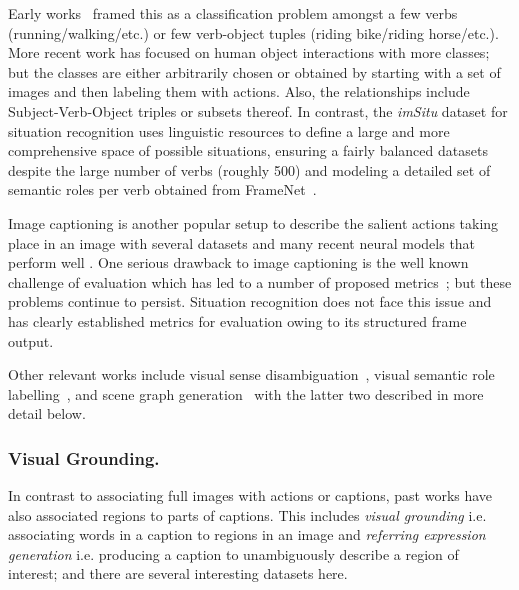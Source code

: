 \documentclass[runningheads]{llncs}
\newcommand{\imsitu}{\emph{imSitu}\xspace}
\begin{document}
Early works~\cite{Ikizler2008RecognizingAF,Gupta2009ObservingHI,Delaitre2010RecognizingHA,Stanford40Actions,Yao2010GroupletAS,Le2013ExploitingLM,everingham2015pascal} framed this as a classification problem amongst a few verbs (running/walking/etc.) or few verb-object tuples (riding bike/riding horse/etc.). More recent work has focused on human object interactions \cite{chao2015hico,tuhoi,hcvrd,ronchi2015describing} with more classes; but the classes are either arbitrarily chosen or obtained by starting with a set of images and then labeling them with actions. Also, the relationships include Subject-Verb-Object triples or subsets thereof. In contrast, the \imsitu{} dataset for situation recognition uses linguistic resources to define a large and more comprehensive space of possible situations, ensuring a fairly balanced datasets despite the large number of verbs (roughly 500) and modeling a detailed set of semantic roles per verb obtained from FrameNet~\cite{framenet}.

Image captioning is another popular setup to describe the salient actions taking place in an image with several datasets \cite{chen2015microsoft,sharma2018conceptual,Agrawal2019nocapsNO} and many recent neural models that perform well \cite{Vinyals2014ShowAT,anderson2018bottom,Karpathy2015DeepVA}. One serious drawback to image captioning is the well known challenge of evaluation which has led to a number of proposed metrics~\cite{meteor,cider,spice,rouge,bleu}; but these problems continue to persist. Situation recognition does not face this issue and has clearly established metrics for evaluation owing to its structured frame output.

Other relevant works include visual sense disambiguation~\cite{Gella2016UnsupervisedVS}, visual semantic role labelling~\cite{gupta2015visual}, and scene graph generation~\cite{visualgenome} with the latter two described in more detail below.

\vspace{-5mm}
\subsubsection{Visual Grounding. }
In contrast to associating full images with actions or captions, past works have also associated regions to parts of captions. This includes \emph{visual grounding} i.e. associating words in a caption to regions in an image and \emph{referring expression generation} i.e. producing a caption to unambiguously describe a region of interest; and there are several interesting datasets here. 
\end{document}
